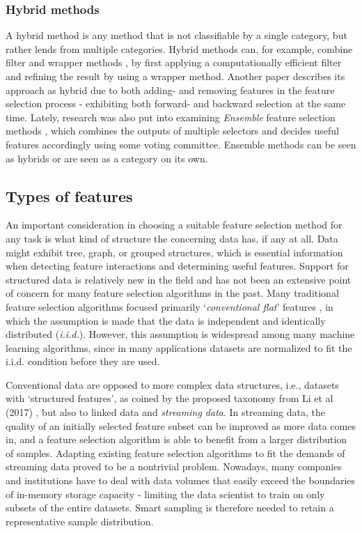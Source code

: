 \documentclass[../main.tex]{subfiles}
\begin{document}
\subsubsection{Hybrid methods}
A hybrid method is any method that is not classifiable by a single category, but rather lends from multiple categories. Hybrid methods can, for example, combine filter and wrapper methods \citep{hsu_hybrid_2011}, by first applying a computationally efficient filter and refining the result by using a wrapper method. Another paper \citep{das_filters_2001} describes its approach as hybrid due to both adding- and removing features in the feature selection process - exhibiting both forward- and backward selection at the same time. Lately, research was also put into examining \textit{Ensemble} feature selection methods \citep{bolon-canedo_ensembles_2019}, which combines the outputs of multiple selectors and decides useful features accordingly using some voting committee. Ensemble methods can be seen as hybrids or are seen as a category on its own.



\subsection{Types of features}
An important consideration in choosing a suitable feature selection method for any task is what kind of structure the concerning data has, if any at all. Data might exhibit tree, graph, or grouped structures, which is essential information when detecting feature interactions and determining useful features. Support for structured data is relatively new in the field and has not been an extensive point of concern for many feature selection algorithms in the past. Many traditional feature selection algorithms focused primarily `\textit{conventional flat}' features \citep{li_feature_2017}, in which the assumption is made that the data is independent and identically distributed (\textit{i.i.d.}). However, this assumption is widespread among many machine learning algorithms, since in many applications datasets are normalized to fit the i.i.d. condition before they are used.

Conventional data are opposed to more complex data structures, i.e., datasets with `structured features', as coined by the proposed taxonomy from Li et al (2017) \cite{li_feature_2017}, but also to linked data and \textit{streaming data}. In streaming data, the quality of an initially selected feature subset can be improved as more data comes in, and a feature selection algorithm is able to benefit from a larger distribution of samples. Adapting existing feature selection algorithms to fit the demands of streaming data proved to be a nontrivial problem. Nowadays, many companies and institutions have to deal with data volumes that easily exceed the boundaries of in-memory storage capacity - limiting the data scientist to train on only subsets of the entire datasets. Smart sampling is therefore needed to retain a representative sample distribution.
\end{document}
